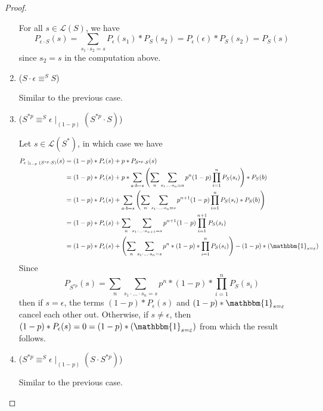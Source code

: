 \documentclass[acmsmall,screen,anonymous]{acmart}
\begin{document}
\begin{proof}
\begin{enumerate}
For all $s \in \mathcal{L}(S)$, we have
$$P_{\epsilon \cdot S}(s) = \sum_{s_1 \cdot s_2 = s}P_{\epsilon}(s_1) * P_S(s_2) = P_{\epsilon}(\epsilon) * P_S(s_2) = P_S(s)$$
since $s_2 = s$ in the computation above.
\item
($S \cdot \epsilon \equiv^S S$)

Similar to the previous case.
\item
($S^{*p} \equiv^S \epsilon \; |_{(1-p)} \; (S^{*p} \cdot S)$)

Let $s \in \mathcal{L}(S^*)$, in which case we have
\begin{align*}
P_{\epsilon \; |_{1-p} \; (S^{*p} \cdot S)}(s) &= (1-p) * P_{\epsilon}(s) + p * P_{S^{*p} \cdot S}(s)\\
&= (1-p) * P_{\epsilon}(s) + p * \sum_{a \cdot b = s}\left(\sum_n \sum_{s_1 \ldots \cdot s_n=a} p^n (1-p) \prod_{i=1}^n P_S(s_i)\right) * P_S(b)\\
&= (1-p) * P_{\epsilon}(s) + \sum_{a \cdot b = s}\left(\sum_n \sum_{s_1 \cdot \ldots \cdot s_n=s} p^{n+1} (1-p) \prod_{i=1}^n P_S(s_i) * P_S(b)\right)\\
&= (1-p) * P_{\epsilon}(s) + \sum_n \sum_{s_1 \cdot \ldots \cdot s_{n+1}=s} p^{n+1} (1-p) \prod_{i=1}^{n+1} P_S(s_i)\\
&= (1-p) * P_{\epsilon}(s) + \left(\sum_n \sum_{s_1 \cdot \ldots \cdot s_n = s} p^n * (1-p) * \prod_{i=1}^n P_S(s_i)\right) - (1-p) * (\mathbbm{1}_{s = \varepsilon})
\end{align*}
Since
$$
P_{S^{*p}}(s) = \sum_n \sum_{s_1 \cdot \ldots \cdot s_n = s} p^n * (1-p) * \prod_{i=1}^n P_S(s_i)
$$
then if $s = \epsilon$, the terms $(1-p) * P_{\epsilon}(s)$ and $(1-p) * \mathbbm{1}_{s=\varepsilon}$ cancel each other out. Otherwise, if $s \neq \epsilon$, then $(1-p) * P_{\epsilon}(s) = 0 = (1-p) * (\mathbbm{1}_{s = \varepsilon})$ from which the result follows.
\item
($S^{*p} \equiv^S \epsilon \; |_{(1-p)} \; (S \cdot S^{*p})$)

Similar to the previous case.
\end{enumerate}
\end{proof}
\end{document}

